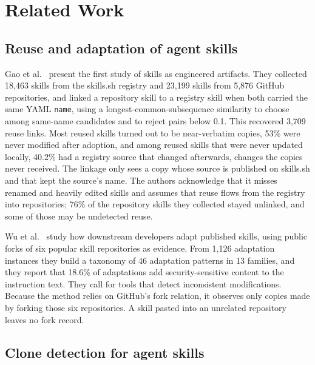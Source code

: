 \section{Related Work}
\label{sec:related}

\subsection{Reuse and adaptation of agent skills}

Gao et al.~\cite{gao2026registry} present the first study of skills as engineered
artifacts. They collected 18,463 skills from the skills.sh registry and 23,199 skills from
5,876 GitHub repositories, and linked a repository skill to a registry skill when both
carried the same YAML \texttt{name}, using a longest-common-subsequence similarity to choose
among same-name candidates and to reject pairs below 0.1. This recovered 3,709 reuse links.
Most reused skills turned out to be near-verbatim copies, 53\% were never modified after
adoption, and among reused skills that were never updated locally, 40.2\% had a registry
source that changed afterwards, changes the copies never received. The linkage only sees a
copy whose source is published on skills.sh and that kept the source's name. The authors
acknowledge that it misses renamed and heavily edited skills and assumes that reuse flows
from the registry into repositories; 76\% of the repository skills they collected stayed
unlinked, and some of those may be undetected reuse.

Wu et al.~\cite{wu2026adaptation} study how downstream developers adapt published skills,
using public forks of six popular skill repositories as evidence. From 1,126 adaptation
instances they build a taxonomy of 46 adaptation patterns in 13 families, and they report
that 18.6\% of adaptations add security-sensitive content to the instruction text. They call
for tools that detect inconsistent modifications. Because the method relies on GitHub's fork
relation, it observes only copies made by forking those six repositories. A skill pasted into
an unrelated repository leaves no fork record.

\subsection{Clone detection for agent skills}

